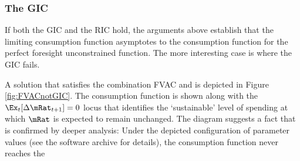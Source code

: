 \documentclass[titlepage]{\econtex}\providecommand{\texname}{BufferStockTheory}%
\begin{document}
\subsubsection{The GIC}

If both the GIC and the RIC hold, the arguments above establish that the limiting consumption
function asymptotes to the consumption function for the perfect foresight unconstrained function.
The more interesting case is where the GIC fails.
\begin{comment}
\WW{}{The same
steps as above lead to the same implication that this requires
$\InvEpShkInv < (\Rfree/\PGro)^{1/\CRRA}\uInvEpShkuInv^{1-1/\CRRA}$,
but when the RIC $\Rfree/\PGro > 1$ holds this condition is much more
easily satisfied.}
If the FVAC holds but the GIC does not, the parameters must satisfy:
\begin{eqnarray}
\Discount \PGro^{1-\CRRA}\Ex[\pshk^{1-\CRRA}] & < 1 < & (\Rfree\Discount)^{1/\CRRA}(\PGro\Ex[\pshk^{-1}])^{-1}. \label{eq:FVACnotGIC}
\end{eqnarray}

Note first that by Jensens's inequality $\Ex[\pshk^{1-\CRRA}] > 1$ and $(\Ex[\pshk^{-1}])^{-1} < 1$,
so \eqref{eq:FVACnotGIC} is stronger than
\begin{eqnarray}
\Discount \PGro^{1-\CRRA} & < 1 < & (\Rfree\Discount)^{1/\CRRA}/\PGro. \label{eq:PFFVACnotPFGIC}
\end{eqnarray}


Suppose $\PGro=1$, $\CRRA=2$ and $\pshk$ is lognormally distributed with $\sigma^{2}_{\pshk}=0.01$ (that is, $\log \pshk \sim \mathcal{N}(-\sigma_{\psi}^{2}/2,\sigma_{\psi}^{2})$) so that $\Ex_{t}[\pshk_{t+1}^{1-\CRRA}] =\Ex_{t}[\pshk_{t+1}^{-1}] =\exp(\sigma^{2}_{\psi})=e^{0.01}.$  Then the condition becomes
\begin{eqnarray}
\Discount e^{0.01} & < 1 < & (\Rfree \Discount)^{1/2}e^{-0.01}
\end{eqnarray}
which can be satisfied, for example, by $\Discount = 0.96$ and $\Rfree=1.08$.
\end{comment}
A solution that satisfies the combination FVAC and
 is depicted in Figure \ref{fig:FVACnotGIC}.  The
consumption function is shown along with the $\Ex_{t}[\Delta
\mRat_{t+1}]=0$ locus that identifies the `sustainable' level of
spending at which $\mRat$ is expected to remain unchanged.  The
diagram suggests a fact that is confirmed by deeper analysis: Under
the depicted configuration of parameter values (see the software
archive for details), the consumption function never reaches the
\end{document}
